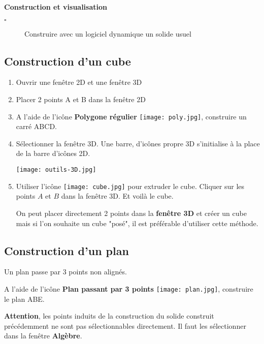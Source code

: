 \begin{titreTice}

\end{titreTice}


\begin{CpsCol}
\textbf{Construction et visualisation}
\begin{description}
\item[$\square$] Construire avec un logiciel dynamique un solide usuel
\end{description}
\end{CpsCol}

\subsection*{Construction d'un cube }

\begin{enumerate}
\item Ouvrir une fenêtre 2D et une fenêtre 3D
\item Placer 2 points A et B dans la fenêtre 2D 
\item A l'aide de l'icône \textbf{Polygone régulier} \texttt{[image: poly.jpg]}, construire un carré ABCD.
\item Sélectionner la fenêtre 3D. Une barre, d'icônes propre 3D s'initialise à la place de la barre d'icônes 2D. 

\texttt{[image: outils-3D.jpg]} 

\item Utiliser l'icône \texttt{[image: cube.jpg]} pour extruder le cube. Cliquer sur les points $A$ et $B$ dans la fenêtre 3D. Et voilà le cube.

On peut placer directement 2 points dans la \textbf{fenêtre 3D }et créer un cube mais si l'on souhaite un cube "posé", il est préférable d'utiliser cette méthode.

\end{enumerate}

\subsection*{Construction d'un plan }

Un plan passe par 3 points non alignés.

 A l'aide de l'icône \textbf{Plan passant par 3 points} \texttt{[image: plan.jpg]}, construire le plan ABE.
 
\textbf{Attention}, les points induits de la construction du solide construit précédemment ne sont pas sélectionnables \mbox{directement}. Il faut les sélectionner dans la fenêtre \textbf{Algèbre}.













